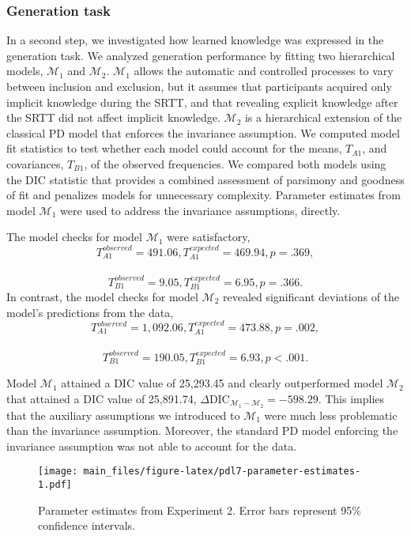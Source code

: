\documentclass[floatsintext,doc]{apa6}
\theoremstyle{definition}
\theoremstyle{definition}
\theoremstyle{definition}
\theoremstyle{remark}
\begin{document}
\subsubsection{Generation task}\label{generation-task-1}

In a second step, we investigated how learned knowledge was expressed in
the generation task. We analyzed generation performance by fitting two
hierarchical models, \(\mathcal{M}_1\) and \(\mathcal{M}_2\).
\(\mathcal{M}_1\) allows the automatic and controlled processes to vary
between inclusion and exclusion, but it assumes that participants
acquired only implicit knowledge during the SRTT, and that revealing
explicit knowledge after the SRTT did not affect implicit knowledge.
\(\mathcal{M}_2\) is a hierarchical extension of the classical PD model
that enforces the invariance assumption. We computed model fit
statistics to test whether each model could account for the means,
\(T_{A1}\), and covariances, \(T_{B1}\), of the observed frequencies. We
compared both models using the DIC statistic that provides a combined
assessment of parsimony and goodness of fit and penalizes models for
unnecessary complexity. Parameter estimates from model \(\mathcal{M}_1\)
were used to address the invariance assumptions, directly.

The model checks for model \(\mathcal{M}_1\) were satisfactory,
\[T_{A1}^{observed} = 491.06, T_{A1}^{expected} = 469.94, p = .369,\]~
\[T_{B1}^{observed} = 9.05, T_{B1}^{expected} = 6.95, p = .366.\] In
contrast, the model checks for model \(\mathcal{M}_2\) revealed
significant deviations of the model's predictions from the data,
\[T_{A1}^{observed} = 1,092.06, T_{A1}^{expected} = 473.88, p = .002,\]~
\[T_{B1}^{observed} = 190.05, T_{B1}^{expected} = 6.93, p < .001.\]

Model \(\mathcal{M}_1\) attained a DIC value of 25,293.45 and clearly
outperformed model \(\mathcal{M}_2\) that attained a DIC value of
25,891.74,
\(\Delta \textrm{DIC}_{\mathcal{M}_1 - \mathcal{M}_2} = -598.29\). This
implies that the auxiliary assumptions we introduced to
\(\mathcal{M}_1\) were much less problematic than the invariance
assumption. Moreover, the standard PD model enforcing the invariance
assumption was not able to account for the data.

\begin{figure}
\centering
\texttt{[image: main\_files/figure-latex/pdl7-parameter-estimates-1.pdf]}
\caption{\label{fig:pdl7-parameter-estimates}Parameter estimates from
Experiment 2. Error bars represent 95\% confidence intervals.}
\end{figure}
\end{document}

